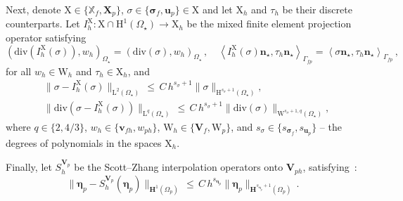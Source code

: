 \documentclass[11pt]{article}
\numberwithin{equation}{section}
\newcommand{\bbeta}{{\boldsymbol\eta}}
\newcommand{\bsi}{{\boldsymbol\sigma}}
\newcommand{\bv}{{\mathbf{v}}}
\newcommand{\bu}{\mathbf{u}}
\newcommand{\bn}{{\mathbf{n}}}
\newcommand{\0}{{\mathbf{0}}}
\def\bX{\mathbf{X}}
\def\bV{\mathbf{V}}
\newcommand\bH{\mathbf{H}}
\newcommand\bbX{\mathbb{X}}
\def\H{\mathrm{H}}
\def\L{\mathrm{L}}
\def\W{\mathrm{W}}
\def\X{\mathrm{X}}
\def\div{\mathrm{div}}
\def\pil{\left<}
\def\pir{\right>}
\numberwithin{equation}{section}
\begin{document}
Next, denote $\X\in \big\{ \bbX_f, \bX_p \big\}$, $\sigma\in
\big\{ \bsi_f, \bu_p \big\}\in \X$ and let $\X_h$ and $\tau_h$ be
their discrete counterparts. 
Let $I^{\X}_h : \X \cap \H^{1}(\Omega_{\star})\to \X_{h}$ be the mixed finite element
projection operator \cite{Brezzi-Fortin} satisfying
\begin{equation}\label{eq:projection2}
(\div(I^{\X}_h(\sigma)), w_h)_{\Omega_\star} = (\div(\sigma), w_h)_{\Omega_\star}\,,\quad 
\pil I^{\X}_h(\sigma)\bn_{\star}, \tau_h\bn_{\star} \pir_{\Gamma_{fp}} = \pil \sigma \bn_{\star}, \tau_{h}\bn_{\star} \pir_{\Gamma_{fp}} \,, 
\end{equation}
for all $w_h\in \W_h$ and $\tau_h\in \X_h$, and
\begin{align}
&\|\sigma - I^{\X}_h(\sigma)\|_{\L^2(\Omega_{\star})} \,\leq\, C\,h^{s_{\sigma} + 1} \| \sigma \|_{\H^{s_{\sigma} + 1}(\Omega_{\star})},  \nonumber \\
&\|\div(\sigma - I^{\X}_h(\sigma))\|_{\L^q(\Omega_{\star})} \,\leq\, C\,h^{s_{\sigma} + 1} \|\div(\sigma)\|_{\W^{s_{\sigma} + 1,q}(\Omega_{\star})},\label{eq:approx-property2}
\end{align}
where $q \in \{2,4/3\}$,  $w_h\in \big\{ \bv_{fh}, w_{ph} \big\}$, $\W_h\in
\big\{ \bV_f, \W_p \big\}$, and $s_{\sigma}\in \big\{
s_{\bsi_f}, s_{\bu_p} \big\}$ -- the degrees of polynomials
in the spaces $\X_h$.

Finally, let $S_h^{\bV_p}$ be the Scott--Zhang interpolation operators onto $\bV_{ph}$, satisfying \cite{sz1990}\,:
\begin{equation}\label{eq: approx property 3}
\|\bbeta_p - S^{\bV_p}_h(\bbeta_p)\|_{\bH^1(\Omega_p)} 
\,\leq\, C\,h^{s_{\bbeta_p}} \| \bbeta_p \|_{\bH^{s_{\bbeta_p} + 1}(\Omega_p)} \,.
\end{equation}
\end{document}
